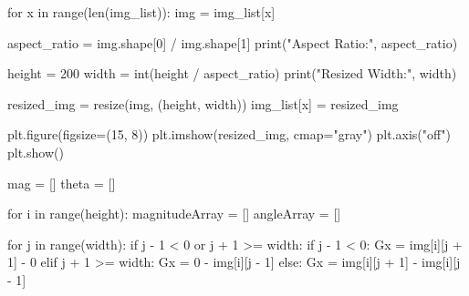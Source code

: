\documentclass[
  letterpaper,
]{report}
\newenvironment{Shaded}{\begin{snugshade}}{\end{snugshade}}
\newcommand{\BuiltInTok}[1]{\textcolor[rgb]{0.00,0.23,0.31}{#1}}
\newcommand{\ControlFlowTok}[1]{\textcolor[rgb]{0.00,0.23,0.31}{#1}}
\newcommand{\DecValTok}[1]{\textcolor[rgb]{0.68,0.00,0.00}{#1}}
\newcommand{\KeywordTok}[1]{\textcolor[rgb]{0.00,0.23,0.31}{#1}}
\newcommand{\NormalTok}[1]{\textcolor[rgb]{0.00,0.23,0.31}{#1}}
\newcommand{\OperatorTok}[1]{\textcolor[rgb]{0.37,0.37,0.37}{#1}}
\newcommand{\StringTok}[1]{\textcolor[rgb]{0.13,0.47,0.30}{#1}}
\begin{document}
\begin{Shaded}
\begin{Highlighting}[]
\ControlFlowTok{for}\NormalTok{ x }\KeywordTok{in} \BuiltInTok{range}\NormalTok{(}\BuiltInTok{len}\NormalTok{(img\_list)):}
\NormalTok{    img }\OperatorTok{=}\NormalTok{ img\_list[x]}
    
\NormalTok{    aspect\_ratio }\OperatorTok{=}\NormalTok{ img.shape[}\DecValTok{0}\NormalTok{] }\OperatorTok{/}\NormalTok{ img.shape[}\DecValTok{1}\NormalTok{]}
    \BuiltInTok{print}\NormalTok{(}\StringTok{"Aspect Ratio:"}\NormalTok{, aspect\_ratio)}
    
\NormalTok{    height }\OperatorTok{=} \DecValTok{200}
\NormalTok{    width }\OperatorTok{=} \BuiltInTok{int}\NormalTok{(height }\OperatorTok{/}\NormalTok{ aspect\_ratio)}
    \BuiltInTok{print}\NormalTok{(}\StringTok{"Resized Width:"}\NormalTok{, width)}
    
\NormalTok{    resized\_img }\OperatorTok{=}\NormalTok{ resize(img, (height, width))}
\NormalTok{    img\_list[x] }\OperatorTok{=}\NormalTok{ resized\_img}
    
\NormalTok{    plt.figure(figsize}\OperatorTok{=}\NormalTok{(}\DecValTok{15}\NormalTok{, }\DecValTok{8}\NormalTok{))}
\NormalTok{    plt.imshow(resized\_img, cmap}\OperatorTok{=}\StringTok{"gray"}\NormalTok{)}
\NormalTok{    plt.axis(}\StringTok{"off"}\NormalTok{)}
\NormalTok{    plt.show()}
    
\NormalTok{    mag }\OperatorTok{=}\NormalTok{ []}
\NormalTok{    theta }\OperatorTok{=}\NormalTok{ []}
    
    \ControlFlowTok{for}\NormalTok{ i }\KeywordTok{in} \BuiltInTok{range}\NormalTok{(height):}
\NormalTok{        magnitudeArray }\OperatorTok{=}\NormalTok{ []}
\NormalTok{        angleArray }\OperatorTok{=}\NormalTok{ []}
        
        \ControlFlowTok{for}\NormalTok{ j }\KeywordTok{in} \BuiltInTok{range}\NormalTok{(width):}
            \ControlFlowTok{if}\NormalTok{ j }\OperatorTok{{-}} \DecValTok{1} \OperatorTok{\textless{}} \DecValTok{0} \KeywordTok{or}\NormalTok{ j }\OperatorTok{+} \DecValTok{1} \OperatorTok{\textgreater{}=}\NormalTok{ width:}
                \ControlFlowTok{if}\NormalTok{ j }\OperatorTok{{-}} \DecValTok{1} \OperatorTok{\textless{}} \DecValTok{0}\NormalTok{:}
\NormalTok{                    Gx }\OperatorTok{=}\NormalTok{ img[i][j }\OperatorTok{+} \DecValTok{1}\NormalTok{] }\OperatorTok{{-}} \DecValTok{0}
                \ControlFlowTok{elif}\NormalTok{ j }\OperatorTok{+} \DecValTok{1} \OperatorTok{\textgreater{}=}\NormalTok{ width:}
\NormalTok{                    Gx }\OperatorTok{=} \DecValTok{0} \OperatorTok{{-}}\NormalTok{ img[i][j }\OperatorTok{{-}} \DecValTok{1}\NormalTok{]}
            \ControlFlowTok{else}\NormalTok{:}
\NormalTok{                Gx }\OperatorTok{=}\NormalTok{ img[i][j }\OperatorTok{+} \DecValTok{1}\NormalTok{] }\OperatorTok{{-}}\NormalTok{ img[i][j }\OperatorTok{{-}} \DecValTok{1}\NormalTok{]}
                

\end{Highlighting}
\end{Shaded}
\end{document}
